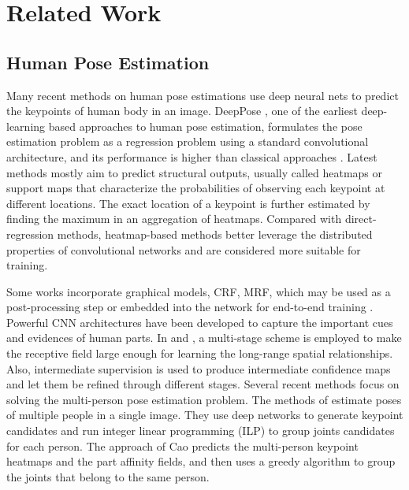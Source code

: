 \documentclass[10pt,twocolumn,letterpaper]{article}
\begin{document}
\section{Related Work}

\subsection{Human Pose Estimation}

Many recent methods on human pose estimations use deep neural nets to predict the keypoints of human body in an image. DeepPose \cite{ToshevS14}, one of the earliest deep-learning based approaches to human pose estimation, formulates the pose estimation problem as a regression problem using a standard convolutional architecture, and its performance is higher than classical approaches \cite{AndrilukaRS09,DantoneGLG13,FelzenszwalbMR08,JohnsonE10,PishchulinAGS13,YangR11}. Latest methods mostly aim to predict structural outputs, usually called heatmaps or support maps that characterize the probabilities of observing each keypoint at different locations. The exact location of a keypoint is further estimated by finding the maximum in an aggregation of heatmaps. Compared with direct-regression methods, heatmap-based methods better leverage the distributed properties of convolutional networks and are considered more suitable for training.

Some works incorporate graphical models, \eg CRF, MRF, which may be used as a post-processing step \cite{ChenY14} or embedded into the network for end-to-end training \cite{ChuYOMYW17,YangOHW16}.
Powerful CNN architectures have been developed to capture the important cues and evidences of human parts. In \cite{WeiRKS16} and \cite{NewellYD16}, a multi-stage scheme is employed to make the receptive field large enough for learning the long-range spatial relationships. Also, intermediate supervision is used to produce intermediate confidence maps and let them be refined through different stages. Several recent methods focus on solving the multi-person pose estimation problem. The methods of \cite{InsafutdinovPAA16,PishchulinITAAG16} estimate poses of multiple people in a single image. They use deep networks to generate keypoint candidates and run integer linear programming (ILP) to group joints candidates for each person. The approach of Cao \etal \cite{CaoSWS16} predicts the multi-person keypoint heatmaps and the part affinity fields, and then uses a greedy algorithm to group the joints that belong to the same person.
\end{document}
